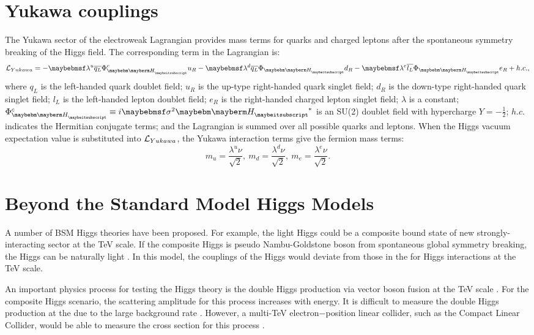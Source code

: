 \section{Yukawa couplings}

The Yukawa sector of the electroweak Lagrangian provides mass terms for quarks and charged leptons after the spontaneous symmetry breaking of the Higgs field. The  corresponding term in the Lagrangian is:
\begin{equation}
\Lagr_{Yukawa} = -\lambda^{u}\overline{q_L}\Phi_{\PH}^{c}u_R  - \lambda^{d}\overline{q_L}\Phi_{\PH}{d}_R - \lambda^{e}\overline{l_L}\Phi_{\PH}e_R + h.c. ,
\end{equation}
where $q_L$ is the left-handed quark doublet field; $u_R$ is the up-type right-handed quark singlet field;  $d_R$ is the down-type right-handed quark singlet field; $l_L$ is the left-handed lepton doublet field; $e_R$ is the right-handed charged lepton singlet field; $\lambda$ is a constant; $\Phi_{\PH}^{c} \equiv i \sigma^2{\PH}^*$ is an SU(2) doublet field with hypercharge $Y = -\frac{1}{2}$; $h.c.$ indicates the Hermitian conjugate terms; and the Lagrangian is summed over all possible quarks and leptons. When the Higgs vacuum expectation value is substituted into $\operatorname{\mathcal{L}}_{Yukawa}$, the Yukawa interaction terms give the fermion mass terms:
\begin{equation}
m_{u} = \frac{\lambda^u{\nu}}{\sqrt{2}},\ m_{d} = \frac{\lambda^d{\nu}}{\sqrt{2}},\ m_{e} = \frac{\lambda^e{\nu}}{\sqrt{2}}.
\end{equation}


\section{Beyond the Standard Model Higgs Models}
\label{sec:theoryHiggsBSM}

A number of BSM Higgs theories have been proposed. For example, the light Higgs could be a composite bound state of new strongly-interacting sector at the TeV scale. If the composite Higgs is  pseudo Nambu-Goldstone boson from spontaneous global symmetry breaking, the Higgs can be naturally light \cite{Kaplan:1983fs}.  In this model, the couplings of the Higgs would deviate from those in the \SM for  Higgs interactions at the TeV scale.


An important physics process for testing the Higgs theory is the double Higgs production via vector boson fusion at the TeV scale \cite{Giudice:2007fh,Contino:2010mh,Contino:2013gna}. For the composite Higgs scenario, the scattering amplitude for this process increases with energy. It is difficult  to measure the double Higgs production at the \LHC due to the large \SM background rate \cite{Contino:2010mh}. However, a multi-TeV electron$-$position linear collider, such as the Compact Linear Collider, would be able to measure the cross section for  this process \cite{Barger:2003rs}.

